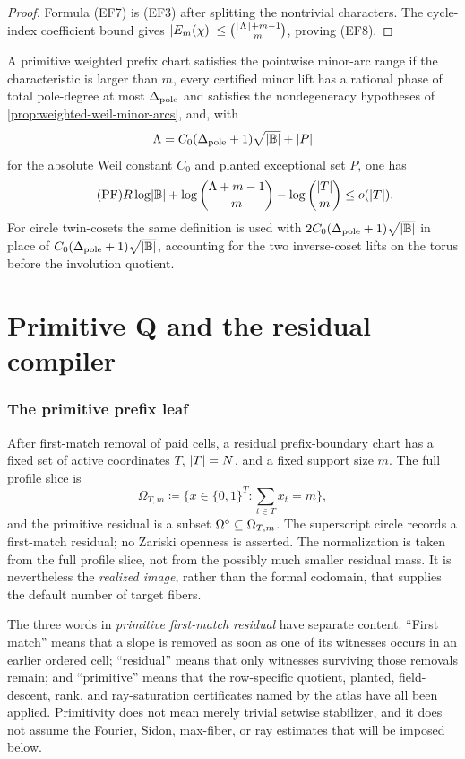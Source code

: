 \documentclass[11pt,a4paper]{amsart}
\numberwithin{equation}{section}
\theoremstyle{remark}
\newcommand{\ceil}[1]{\left\lceil #1\right\rceil}\newcommand{\defeq}{\coloneqq}
\begin{document}
\begin{proof}
Formula \textup{(EF7)} is \textup{(EF3)} after splitting the nontrivial
characters.  The cycle-index coefficient bound gives
\(\abs{E_m(\chi)}\le\binom{\ceil\Lambda+m-1}{m}\), proving
\textup{(EF8)}.
\end{proof}

\begin{definition}\label{def:prefix-flat-range}
A primitive weighted prefix chart satisfies the pointwise minor-arc range if the characteristic is larger than \(m\), every certified minor lift has a rational phase of total pole-degree at most \(\Delta_{\rm pole}\) and satisfies the nondegeneracy hypotheses of \cref{prop:weighted-weil-minor-arcs}, and, with
\[
        \Lambda=C_0(\Delta_{\rm pole}+1)\sqrt{\lvert \mathbb B\rvert}+\lvert P\rvert
\]
for the absolute Weil constant \(C_0\) and planted exceptional set \(P\), one has
\[
        \tag{PF}
        R\log\lvert \mathbb B\rvert+
        \log\binom{\Lambda+m-1}{m}
        -\log\binom{\lvert T\rvert}{m}\le o(\lvert T\rvert).
\]
For circle twin-cosets the same definition is used with \(2C_0(\Delta_{\rm pole}+1)\sqrt{\lvert \mathbb B\rvert}\) in place of \(C_0(\Delta_{\rm pole}+1)\sqrt{\lvert \mathbb B\rvert}\), accounting for the two inverse-coset lifts on the torus before the involution quotient.
\end{definition}


\part{Primitive Q and the residual compiler}
\section{The primitive prefix leaf}\label{sec:primitive-leaf}

After first-match removal of paid cells, a residual prefix-boundary chart
has a fixed set of active coordinates \(T\), \(\lvert T\rvert=N\), and a fixed
support size \(m\).  The full profile slice is
\[
        \Omega_{T,m}\defeq\{x\in\{0,1\}^{T}:\sum_{t\in T}x_t=m\},
\]
and the primitive residual is a subset \(\Omega^{\circ}\subseteq\Omega_{T,m}\).
The superscript circle records a first-match residual; no Zariski openness
is asserted.  The normalization is taken from the full profile slice, not
from the possibly much smaller residual mass.  It is nevertheless the
\emph{realized image}, rather than the formal codomain, that supplies the
default number of target fibers.

The three words in \emph{primitive first-match residual} have separate
content.  ``First match'' means that a slope is removed as soon as one of
its witnesses occurs in an earlier ordered cell; ``residual'' means that
only witnesses surviving those removals remain; and ``primitive'' means
that the row-specific quotient, planted, field-descent, rank, and ray-saturation
certificates named by the atlas have all been applied.  Primitivity does
not mean merely trivial setwise stabilizer, and it does not assume the
Fourier, Sidon, max-fiber, or ray estimates that will be imposed below.
\end{document}
